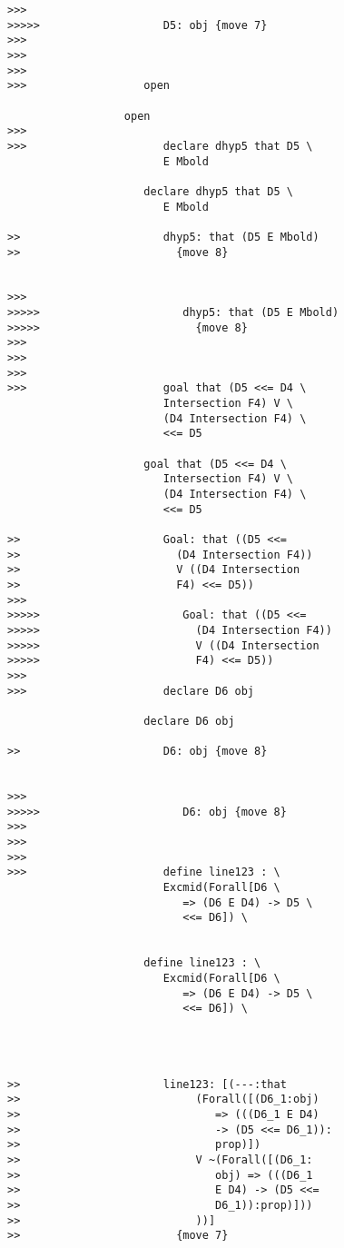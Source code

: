 \documentclass[12pt]{article}
\begin{document}
\begin{verbatim}
>>>
>>>>>                   D5: obj {move 7}
>>>
>>>
>>>
>>>                  open

                  open
>>>
>>>                     declare dhyp5 that D5 \
                        E Mbold

                     declare dhyp5 that D5 \
                        E Mbold

>>                      dhyp5: that (D5 E Mbold)
>>                        {move 8}


>>>
>>>>>                      dhyp5: that (D5 E Mbold)
>>>>>                        {move 8}
>>>
>>>
>>>
>>>                     goal that (D5 <<= D4 \
                        Intersection F4) V \
                        (D4 Intersection F4) \
                        <<= D5

                     goal that (D5 <<= D4 \
                        Intersection F4) V \
                        (D4 Intersection F4) \
                        <<= D5

>>                      Goal: that ((D5 <<=
>>                        (D4 Intersection F4))
>>                        V ((D4 Intersection
>>                        F4) <<= D5))
>>>
>>>>>                      Goal: that ((D5 <<=
>>>>>                        (D4 Intersection F4))
>>>>>                        V ((D4 Intersection
>>>>>                        F4) <<= D5))
>>>
>>>                     declare D6 obj

                     declare D6 obj

>>                      D6: obj {move 8}


>>>
>>>>>                      D6: obj {move 8}
>>>
>>>
>>>
>>>                     define line123 : \
                        Excmid(Forall[D6 \
                           => (D6 E D4) -> D5 \
                           <<= D6]) \
                        

                     define line123 : \
                        Excmid(Forall[D6 \
                           => (D6 E D4) -> D5 \
                           <<= D6]) \
                        



>>                      line123: [(---:that
>>                           (Forall([(D6_1:obj)
>>                              => (((D6_1 E D4)
>>                              -> (D5 <<= D6_1)):
>>                              prop)])
>>                           V ~(Forall([(D6_1:
>>                              obj) => (((D6_1
>>                              E D4) -> (D5 <<=
>>                              D6_1)):prop)]))
>>                           ))]
>>                        {move 7}



\end{verbatim}
\end{document}
